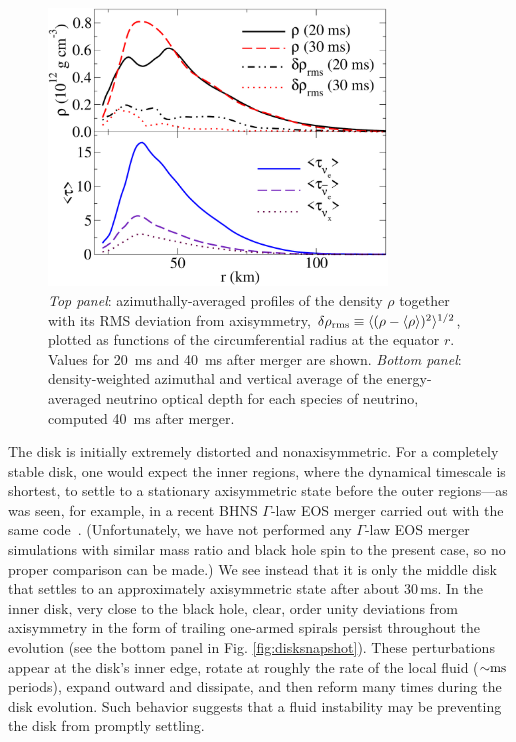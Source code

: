 \begin{figure}
\centering
\includegraphics[width=9cm]{Figures/thickness}
\caption[Radial profiles of disk density and opacity]{{\em Top panel}: azimuthally-averaged profiles of the
density $\rho$ together with its RMS deviation from axisymmetry,
$\delta\rho_{\rm rms}\equiv \langle(\rho-\langle\rho\rangle)^2\rangle^{1/2}$,
plotted as functions of the circumferential radius
at the equator $r$.  Values for 20~ms and 40~ms after merger are shown.  
{\em Bottom panel}: density-weighted azimuthal and vertical average of
the energy-averaged neutrino optical depth for each species of neutrino,
computed 40~ms after merger.}
\label{fig:thickness}
\end{figure}

The disk is initially extremely distorted and nonaxisymmetric.  For
a completely stable disk, one would expect the inner regions, where
the dynamical timescale is shortest, to settle to a stationary
axisymmetric state before the outer regions---as was seen, for example,
in a recent BHNS $\Gamma$-law EOS merger carried out with the same
code~\citep{love2013-bhns_high_spin}.  (Unfortunately, we have not performed
any $\Gamma$-law EOS merger simulations with similar mass ratio and
black hole spin to the present case, so no proper comparison can be
made.)  We see instead that it is only the
middle disk that settles to an approximately axisymmetric state after
about 30\,ms. 
In the inner disk, very close to the black hole, clear, order unity
deviations from axisymmetry in the form of trailing one-armed spirals
persist throughout the evolution (see the bottom panel in Fig.
\ref{fig:disksnapshot}).  These perturbations appear at the
disk's inner edge, rotate at roughly the rate of the local fluid
($\mathord{\sim}\rm ms$ periods), expand outward and dissipate, and then reform
many times during the disk evolution.  Such behavior suggests that
a fluid instability may be preventing the disk from promptly settling.

